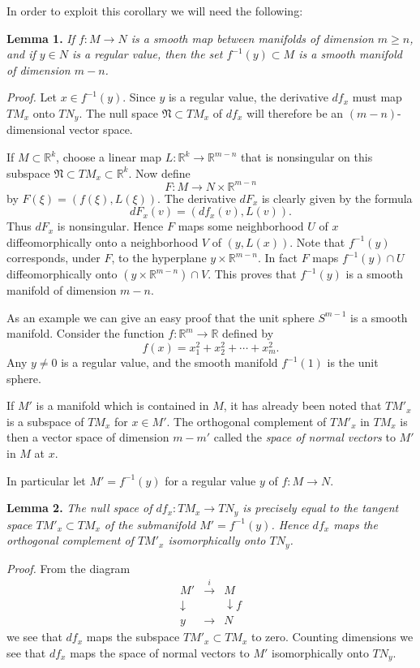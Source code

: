 In order to exploit this corollary we will need the following:

\noindent\textbf{Lemma 1.} \textit{If $f : M \to N$ is a smooth map between manifolds of dimension $m \geq n$, and if $y \in N$ is a regular value, then the set $f^{-1}(y) \subset M$ is a smooth manifold of dimension $m - n$.}

\noindent\textit{Proof.} Let $x \in f^{-1}(y)$. Since $y$ is a regular value, the derivative $df_x$ must map $TM_x$ onto $TN_y$. The null space $\mathfrak{N} \subset TM_x$ of $df_x$ will therefore be an $(m-n)$-dimensional vector space.

If $M \subset \mathbb{R}^k$, choose a linear map $L : \mathbb{R}^k \to \mathbb{R}^{m-n}$ that is nonsingular on this subspace $\mathfrak{N} \subset TM_x \subset \mathbb{R}^k$. Now define
\[
F : M \to N \times \mathbb{R}^{m-n}
\]
by $F(\xi) = (f(\xi), L(\xi))$. The derivative $dF_x$ is clearly given by the formula
\[
dF_x(v) = (df_x(v), L(v)).
\]
Thus $dF_x$ is nonsingular. Hence $F$ maps some neighborhood $U$ of $x$ diffeomorphically onto a neighborhood $V$ of $(y, L(x))$. Note that $f^{-1}(y)$ corresponds, under $F$, to the hyperplane $y \times \mathbb{R}^{m-n}$. In fact $F$ maps $f^{-1}(y) \cap U$ diffeomorphically onto $(y \times \mathbb{R}^{m-n}) \cap V$. This proves that $f^{-1}(y)$ is a smooth manifold of dimension $m - n$.

As an example we can give an easy proof that the unit sphere $S^{m-1}$ is a smooth manifold. Consider the function $f : \mathbb{R}^m \to \mathbb{R}$ defined by
\[
f(x) = x_1^2 + x_2^2 + \cdots + x_m^2.
\]
Any $y \neq 0$ is a regular value, and the smooth manifold $f^{-1}(1)$ is the unit sphere.

If $M'$ is a manifold which is contained in $M$, it has already been noted that $TM'_x$ is a subspace of $TM_x$ for $x \in M'$. The orthogonal complement of $TM'_x$ in $TM_x$ is then a vector space of dimension $m - m'$ called the \emph{space of normal vectors} to $M'$ in $M$ at $x$.

In particular let $M' = f^{-1}(y)$ for a regular value $y$ of $f : M \to N$.



\noindent\textbf{Lemma 2.} \textit{The null space of $df_x : TM_x \to TN_y$ is precisely equal to the tangent space $TM'_x \subset TM_x$ of the submanifold $M' = f^{-1}(y)$. Hence $df_x$ maps the orthogonal complement of $TM'_x$ isomorphically onto $TN_y$.}

\noindent\textit{Proof.} From the diagram
\[
\begin{array}{ccc}
M' & \xrightarrow{i} & M \\
\downarrow & & \downarrow f \\
y & \longrightarrow & N
\end{array}
\]
we see that $df_x$ maps the subspace $TM'_x \subset TM_x$ to zero. Counting dimensions we see that $df_x$ maps the space of normal vectors to $M'$ isomorphically onto $TN_y$.

